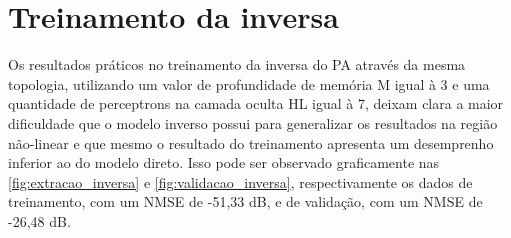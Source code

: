 \section{Treinamento da inversa} \label{sec:estudoi-inv}
Os resultados práticos no treinamento da inversa do PA através da mesma topologia, utilizando um valor de profundidade de memória M igual à 3 e uma quantidade de perceptrons na camada oculta HL igual à 7, deixam clara a maior dificuldade que o modelo inverso possui para generalizar os resultados na região não-linear e que mesmo o resultado do treinamento apresenta um desemprenho inferior ao do modelo direto. Isso pode ser observado graficamente nas \autoref{fig:extracao_inversa} e \autoref{fig:validacao_inversa}, respectivamente os dados de treinamento, com um NMSE de -51,33 dB, e de validação, com um NMSE de -26,48 dB.

